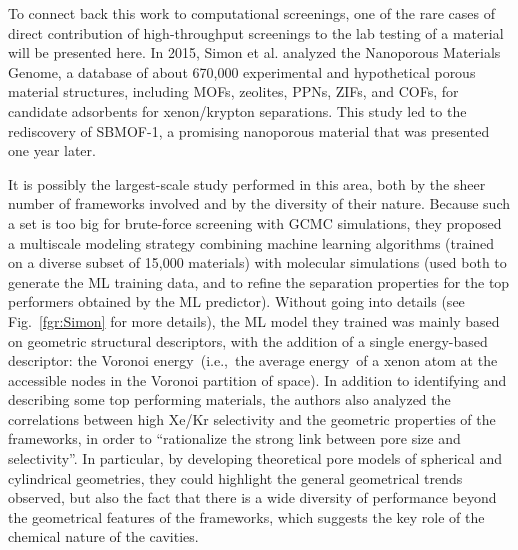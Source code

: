 \documentclass[main.tex]{subfiles}
\begin{document}
To connect back this work to computational screenings, one of the rare cases of direct contribution of high-throughput screenings to the lab testing of a material will be presented here. In 2015, Simon et al.\autocite{Simon_2015} analyzed the Nanoporous Materials Genome,\autocite{Simon_2015_EES, Boyd_2017} a database of about 670,000 experimental and hypothetical porous material structures, including MOFs, zeolites, PPNs, ZIFs, and COFs, for candidate adsorbents for xenon/krypton separations. This study led to the rediscovery of SBMOF-1, a promising nanoporous material that was presented one year later.\autocite{Banerjee_2016}

It is possibly the largest-scale study performed in this area, both by the sheer number of frameworks involved and by the diversity of their nature. Because such a set is too big for brute-force screening with GCMC simulations, they proposed a multiscale modeling strategy combining machine learning algorithms (trained on a diverse subset of 15,000 materials) with molecular simulations (used both to generate the ML training data, and to refine the separation properties for the top performers obtained by the ML predictor). Without going into details (see Fig.~\ref{fgr:Simon} for more details), the ML model they trained was mainly based on geometric structural descriptors, with the addition of a single energy-based descriptor: the Voronoi energy\ (i.e.,\ the average energy\ of a xenon atom at the accessible nodes in the Voronoi partition of space). In addition to identifying and describing some top performing materials, the authors also analyzed the correlations between high Xe/Kr selectivity and the geometric properties of the frameworks, in order to ``rationalize the strong link between pore size and selectivity''. In particular, by developing theoretical pore models of spherical and cylindrical geometries, they could highlight the general geometrical trends observed, but also the fact that there is a wide diversity of performance beyond the geometrical features of the frameworks, which suggests the key role of the chemical nature of the cavities.
\end{document}
